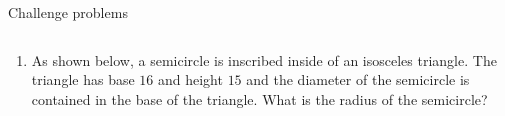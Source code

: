 \documentclass[9pt,aspectratio=169]{beamer}
\begin{document}
\begin{frame}{Challenge problems}
\begin{columns}[T]
\begin{column}{0.5\textwidth}
\begin{enumerate}
        \item As shown below, a semicircle is inscribed inside of an isosceles triangle. The triangle has base $16$ and height $15$ and the diameter of the semicircle is contained in the base of the triangle.  What is the radius of the semicircle?

      \end{enumerate}
    \end{column}
  \end{columns}
\end{frame}

\end{document}
